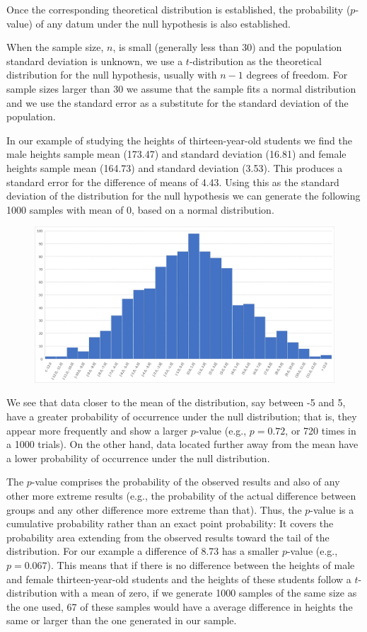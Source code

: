 \documentclass[
]{book}
\theoremstyle{definition}
\theoremstyle{definition}
\theoremstyle{definition}
\theoremstyle{definition}
\theoremstyle{remark}
\begin{document}
Once the corresponding theoretical distribution is established, the probability (\(p\)-value) of any datum under the null hypothesis is also established.

When the sample size, \(n\), is small (generally less than 30) and the population standard deviation is unknown, we use a \(t\)-distribution as the theoretical distribution for the null hypothesis, usually with \(n-1\) degrees of freedom. For sample sizes larger than 30 we assume that the sample fits a normal distribution and we use the standard error as a substitute for the standard deviation of the population.

In our example of studying the heights of thirteen-year-old students we find the male heights sample mean (173.47) and standard deviation (16.81) and female heights sample mean (164.73) and standard deviation (3.53). This produces a standard error for the difference of means of 4.43. Using this as the standard deviation of the distribution for the null hypothesis we can generate the following 1000 samples with mean of 0, based on a normal distribution.

\begin{figure}

{\centering \includegraphics[width=0.7\linewidth]{images/heights_13_dist} 

}

\end{figure}

We see that data closer to the mean of the distribution, say between -5 and 5, have a greater probability of occurrence under the null distribution; that is, they appear more frequently and show a larger \(p\)-value (e.g., \(p = 0.72\), or 720 times in a 1000 trials). On the other hand, data located further away from the mean have a lower probability of occurrence under the null distribution.

The \(p\)-value comprises the probability of the observed results and also of any other more extreme results (e.g., the probability of the actual difference between groups and any other difference more extreme than that). Thus, the \(p\)-value is a cumulative probability rather than an exact point probability: It covers the probability area extending from the observed results toward the tail of the distribution. For our example a difference of 8.73 has a smaller \(p\)-value (e.g., \(p = 0.067\)). This means that if there is no difference between the heights of male and female thirteen-year-old students and the heights of these students follow a \(t\)-distribution with a mean of zero, if we generate 1000 samples of the same size as the one used, 67 of these samples would have a average difference in heights the same or larger than the one generated in our sample.
\end{document}
